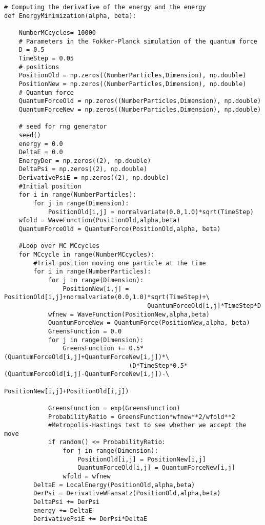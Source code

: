\documentclass{beamer}
\begin{document}
\begin{frame}
\begin{verbatim}
# Computing the derivative of the energy and the energy 
def EnergyMinimization(alpha, beta):

    NumberMCcycles= 10000
    # Parameters in the Fokker-Planck simulation of the quantum force
    D = 0.5
    TimeStep = 0.05
    # positions
    PositionOld = np.zeros((NumberParticles,Dimension), np.double)
    PositionNew = np.zeros((NumberParticles,Dimension), np.double)
    # Quantum force
    QuantumForceOld = np.zeros((NumberParticles,Dimension), np.double)
    QuantumForceNew = np.zeros((NumberParticles,Dimension), np.double)

    # seed for rng generator 
    seed()
    energy = 0.0
    DeltaE = 0.0
    EnergyDer = np.zeros((2), np.double)
    DeltaPsi = np.zeros((2), np.double)
    DerivativePsiE = np.zeros((2), np.double)
    #Initial position
    for i in range(NumberParticles):
        for j in range(Dimension):
            PositionOld[i,j] = normalvariate(0.0,1.0)*sqrt(TimeStep)
    wfold = WaveFunction(PositionOld,alpha,beta)
    QuantumForceOld = QuantumForce(PositionOld,alpha, beta)

    #Loop over MC MCcycles
    for MCcycle in range(NumberMCcycles):
        #Trial position moving one particle at the time
        for i in range(NumberParticles):
            for j in range(Dimension):
                PositionNew[i,j] = PositionOld[i,j]+normalvariate(0.0,1.0)*sqrt(TimeStep)+\
                                       QuantumForceOld[i,j]*TimeStep*D
            wfnew = WaveFunction(PositionNew,alpha,beta)
            QuantumForceNew = QuantumForce(PositionNew,alpha, beta)
            GreensFunction = 0.0
            for j in range(Dimension):
                GreensFunction += 0.5*(QuantumForceOld[i,j]+QuantumForceNew[i,j])*\
	                              (D*TimeStep*0.5*(QuantumForceOld[i,j]-QuantumForceNew[i,j])-\
                                      PositionNew[i,j]+PositionOld[i,j])
      
            GreensFunction = exp(GreensFunction)
            ProbabilityRatio = GreensFunction*wfnew**2/wfold**2
            #Metropolis-Hastings test to see whether we accept the move
            if random() <= ProbabilityRatio:
                for j in range(Dimension):
                    PositionOld[i,j] = PositionNew[i,j]
                    QuantumForceOld[i,j] = QuantumForceNew[i,j]
                wfold = wfnew
        DeltaE = LocalEnergy(PositionOld,alpha,beta)
        DerPsi = DerivativeWFansatz(PositionOld,alpha,beta)
        DeltaPsi += DerPsi
        energy += DeltaE
        DerivativePsiE += DerPsi*DeltaE
            

\end{verbatim}
\end{frame}
\end{document}
